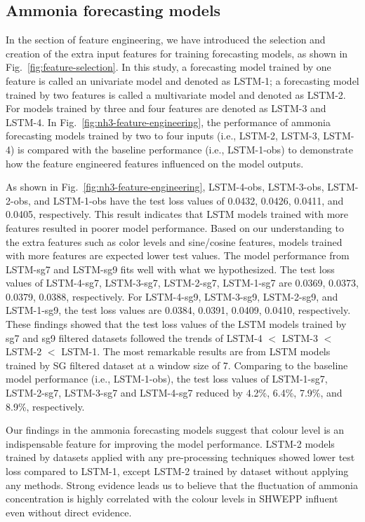 \subsection{Ammonia forecasting models}
In the section of feature engineering, we have introduced the selection and creation of the extra input features for training forecasting models, as shown in Fig.~\ref{fig:feature-selection}. In this study, a forecasting model trained by one feature is called an univariate model and denoted as LSTM-1; a forecasting model trained by two features is called a multivariate model and denoted as LSTM-2. For models trained by three and four features are denoted as LSTM-3 and LSTM-4. In Fig.~\ref{fig:nh3-feature-engineering}, the performance of ammonia forecasting models trained by two to four inputs (i.e., LSTM-2, LSTM-3, LSTM-4) is compared with the baseline performance (i.e., LSTM-1-obs) to demonstrate how the feature engineered features influenced on the model outputs. 

As shown in Fig.~\ref{fig:nh3-feature-engineering}, LSTM-4-obs, LSTM-3-obs, LSTM-2-obs, and LSTM-1-obs have the test loss values of 0.0432, 0.0426, 0.0411, and 0.0405, respectively. This result indicates that LSTM models trained with more features resulted in poorer model performance. Based on our understanding to the extra features such as color levels and sine/cosine features, models trained with more features are expected lower test values. The model performance from LSTM-sg7 and LSTM-sg9 fits well with what we hypothesized. The test loss values of LSTM-4-sg7, LSTM-3-sg7, LSTM-2-sg7, LSTM-1-sg7 are 0.0369, 0.0373, 0.0379, 0.0388, respectively. For LSTM-4-sg9, LSTM-3-sg9, LSTM-2-sg9, and LSTM-1-sg9, the test loss values are 0.0384, 0.0391, 0.0409, 0.0410, respectively. These findings showed that the test loss values of the LSTM models trained by sg7 and sg9 filtered datasets followed the trends of LSTM-4 $<$ LSTM-3 $<$ LSTM-2 $<$ LSTM-1. The most remarkable results are from LSTM models trained by SG filtered dataset at a window size of 7. Comparing to the baseline model performance (i.e., LSTM-1-obs), the test loss values of LSTM-1-sg7, LSTM-2-sg7, LSTM-3-sg7 and LSTM-4-sg7 reduced by 4.2\%, 6.4\%, 7.9\%, and 8.9\%, respectively.

Our findings in the ammonia forecasting models suggest that colour level is an indispensable feature for improving the model performance. LSTM-2 models trained by datasets applied with any pre-processing techniques showed lower test loss compared to LSTM-1, except LSTM-2 trained by dataset without applying any methods. Strong evidence leads us to believe that the fluctuation of ammonia concentration is highly correlated with the colour levels in SHWEPP influent even without direct evidence.

